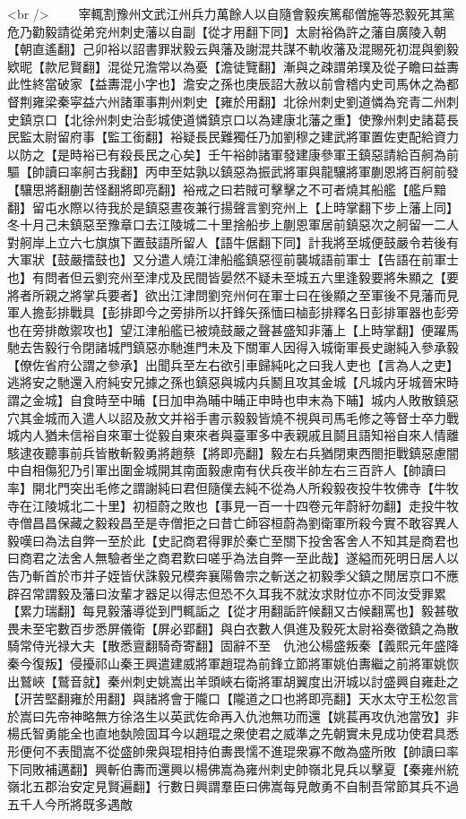 <br />
　　宰輒割豫州文武江州兵力萬餘人以自隨會毅疾篤郗僧施等恐毅死其黨危乃勸毅請從弟兖州刺史藩以自副【從才用翻下同】太尉裕偽許之藩自廣陵入朝【朝直遙翻】己卯裕以詔書罪狀毅云與藩及謝混共謀不軌收藩及混賜死初混與劉毅欵昵【款尼賢翻】混從兄澹常以為憂【澹徒覽翻】漸與之疎謂弟璞及從子瞻曰益夀此性終當破家【益夀混小字也】澹安之孫也庚辰詔大赦以前會稽内史司馬休之為都督荆雍梁秦寜益六州諸軍事荆州刺史【雍於用翻】北徐州刺史劉道憐為兖青二州刺史鎮京口【北徐州刺史治彭城使道憐鎮京口以為建康北藩之重】使豫州刺史諸葛長民監太尉留府事【監工銜翻】裕疑長民難獨任乃加劉穆之建武將軍置佐吏配給資力以防之【是時裕已有殺長民之心矣】壬午裕帥諸軍發建康參軍王鎮惡請給百舸為前驅【帥讀曰率舸古我翻】丙申至姑孰以鎮惡為振武將軍與龍驤將軍蒯恩將百舸前發【驤思將翻蒯苦怪翻將即亮翻】裕戒之曰若賊可擊擊之不可者燒其船艦【艦戶黯翻】留屯水際以待我於是鎮惡晝夜兼行揚聲言劉兖州上【上時掌翻下步上藩上同】冬十月己未鎮惡至豫章口去江陵城二十里捨船步上蒯恩軍居前鎮惡次之舸留一二人對舸岸上立六七旗旗下置鼓語所留人【語牛倨翻下同】計我將至城便鼓嚴令若後有大軍狀【鼓嚴擂鼓也】又分遣人燒江津船艦鎮惡徑前襲城語前軍士【告語在前軍士也】有問者但云劉兖州至津戍及民間皆晏然不疑未至城五六里逢毅要將朱顯之【要將者所親之將掌兵要者】欲出江津問劉兖州何在軍士曰在後顯之至軍後不見藩而見軍人擔彭排戰具【彭排即今之旁排所以扞鋒矢孫愐曰樐彭排釋名日彭排軍器也彭旁也在旁排敵禦攻也】望江津船艦已被燒鼓嚴之聲甚盛知非藩上【上時掌翻】便躍馬馳去吿毅行令閉諸城門鎮惡亦馳進門未及下關軍人因得入城衛軍長史謝純入參承毅【僚佐省府公謂之參承】出聞兵至左右欲引車歸純叱之曰我人吏也【言為人之吏】逃將安之馳還入府純安兄據之孫也鎮惡與城内兵鬭且攻其金城【凡城内牙城晉宋時謂之金城】自食時至中晡【日加申為晡中晡正申時也申末為下晡】城内人敗散鎮惡穴其金城而入遣人以詔及赦文并裕手書示毅毅皆燒不視與司馬毛修之等督士卒力戰城内人猶未信裕自來軍士從毅自東來者與臺軍多中表親戚且鬬且語知裕自來人情離駭逮夜聽事前兵皆散斬毅勇將趙蔡【將即亮翻】毅左右兵猶閉東西閤拒戰鎮惡慮闇中自相傷犯乃引軍出圍金城開其南面毅慮南有伏兵夜半帥左右三百許人【帥讀曰率】開北門突出毛修之謂謝純曰君但隨僕去純不從為人所殺毅夜投牛牧佛寺【牛牧寺在江陵城北二十里】初桓蔚之敗也【事見一百一十四卷元年蔚紆勿翻】走投牛牧寺僧昌昌保藏之毅殺昌至是寺僧拒之曰昔亡師容桓蔚為劉衛軍所殺今實不敢容異人毅嘆曰為法自弊一至於此【史記商君得罪於秦亡至關下投舍客舍人不知其是商君也曰商君之法舍人無驗者坐之商君歎曰嗟乎為法自弊一至此哉】遂縊而死明日居人以告乃斬首於市并子姪皆伏誅毅兄模奔襄陽魯宗之斬送之初毅季父鎮之閒居京口不應辟召常謂毅及藩曰汝輩才器足以得志但恐不久耳我不就汝求財位亦不同汝受罪累【累力瑞翻】每見毅藩導從到門輒詬之【從才用翻詬許候翻又古候翻罵也】毅甚敬畏未至宅數百步悉屏儀衛【屏必郢翻】與白衣數人俱進及毅死太尉裕奏徵鎮之為散騎常侍光禄大夫【散悉亶翻騎奇寄翻】固辭不至　仇池公楊盛叛秦【義熙元年盛降秦今復叛】侵擾祁山秦王興遣建威將軍趙琨為前鋒立節將軍姚伯夀繼之前將軍姚恢出鷲峽【鷲音就】秦州刺史姚嵩出羊頭峽右衛將軍胡翼度出汧城以討盛興自雍赴之【汧苦堅翻雍於用翻】與諸將會于隴口【隴道之口也將即亮翻】天水太守王松忽言於嵩曰先帝神略無方徐洛生以英武佐命再入仇池無功而還【姚萇再攻仇池當攷】非楊氏智勇能全也直地埶險固耳今以趙琨之衆使君之威準之先朝實未見成功使君具悉形便何不表聞嵩不從盛帥衆與琨相持伯夀畏懦不進琨衆寡不敵為盛所敗【帥讀曰率下同敗補邁翻】興斬伯夀而還興以楊佛嵩為雍州刺史帥嶺北見兵以擊夏【秦雍州統嶺北五郡治安定見賢遍翻】行數日興謂羣臣曰佛嵩每見敵勇不自制吾常節其兵不過五千人今所將既多遇敵